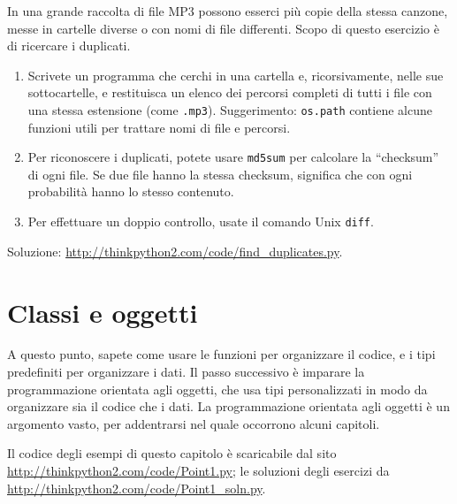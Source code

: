 \documentclass[10pt]{book}
\begin{document}
\vspace{0.2in}
\begin{exercise}
\label{checksum}

In una grande raccolta di file MP3 possono esserci più copie della stessa canzone, messe in cartelle diverse o con nomi di file differenti. Scopo di questo esercizio è di ricercare i duplicati.

\begin{enumerate}

\item Scrivete un programma che cerchi in una cartella e, ricorsivamente, nelle sue sottocartelle, e restituisca un elenco dei percorsi completi di tutti i file con una stessa estensione (come {\tt .mp3}).
Suggerimento: {\tt os.path} contiene alcune funzioni utili per trattare nomi di file e percorsi.

\item Per riconoscere i duplicati, potete usare {\tt md5sum}
per calcolare la ``checksum'' di ogni file. Se due file hanno la stessa checksum, significa che con ogni probabilità hanno lo stesso contenuto.

\item Per effettuare un doppio controllo, usate il comando Unix {\tt diff}.

\end{enumerate}

Soluzione: \url{http://thinkpython2.com/code/find_duplicates.py}.

\end{exercise}



\chapter{Classi e oggetti}
\label{clobjects}

A questo punto, sapete come usare le funzioni per organizzare il codice, e i tipi predefiniti per organizzare i dati. Il passo successivo è imparare la programmazione orientata agli oggetti, che usa tipi personalizzati in modo da organizzare sia il codice che i dati. La programmazione orientata agli oggetti è un argomento vasto, per addentrarsi nel quale occorrono alcuni capitoli.

Il codice degli esempi di questo capitolo è scaricabile dal sito
\url{http://thinkpython2.com/code/Point1.py}; le soluzioni degli esercizi da
\url{http://thinkpython2.com/code/Point1_soln.py}.
\end{document}
